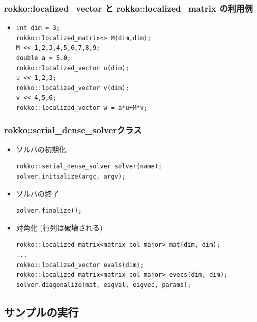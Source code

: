 \begin{frame}[c,fragile]
  \frametitle{rokko::localized\_vector と rokko::localized\_matrix の利用例}
  \begin{itemize}
  \item {}
\begin{lstlisting}
int dim = 3;
rokko::localized_matrix<> M(dim,dim);
M << 1,2,3,4,5,6,7,8,9;
double a = 5.0;
rokko::localized_vector u(dim);
u << 1,2,3;
rokko::localized_vector v(dim);
v << 4,5,6;
rokko::localized_vector w = a*u+M*v;
\end{lstlisting}
  \end{itemize}
\end{frame}

\begin{frame}[c,fragile]
  \frametitle{rokko::serial_dense_solverクラス}
  \begin{itemize}
  \item ソルバの初期化
\begin{lstlisting}
rokko::serial_dense_solver solver(name);
solver.initialize(argc, argv);
\end{lstlisting}
  \item ソルバの終了
\begin{lstlisting}
solver.finalize();
\end{lstlisting}
  \item 対角化 (行列は破壊される)
\begin{lstlisting}
rokko::localized_matrix<matrix_col_major> mat(dim, dim);
...
rokko::localized_vector evals(dim);
rokko::localized_matrix<matrix_col_major> evecs(dim, dim);
solver.diagonalize(mat, eigval, eigvec, params);
\end{lstlisting}
  \end{itemize}
\end{frame}

\subsection{サンプルの実行}

